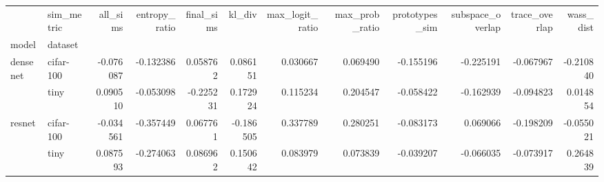 \begin{tabular}{llrrrrrrrrrr}
\toprule
       & sim\_metric &  all\_sims &  entropy\_ratio &  final\_sims &    kl\_div &  max\_logit\_ratio &  max\_prob\_ratio &  prototypes\_sim &  subspace\_overlap &  trace\_overlap &  wass\_dist \\
model & dataset &           &                &             &           &                  &                 &                 &                   &                &            \\
\midrule
densenet & cifar-100 & -0.076087 &      -0.132386 &    0.058762 &  0.086151 &         0.030667 &        0.069490 &       -0.155196 &         -0.225191 &      -0.067967 &  -0.210840 \\
       & tiny &  0.090510 &      -0.053098 &   -0.225231 &  0.172924 &         0.115234 &        0.204547 &       -0.058422 &         -0.162939 &      -0.094823 &   0.014854 \\
resnet & cifar-100 & -0.034561 &      -0.357449 &    0.067761 & -0.186505 &         0.337789 &        0.280251 &       -0.083173 &          0.069066 &      -0.198209 &  -0.055021 \\
       & tiny &  0.087593 &      -0.274063 &    0.086962 &  0.150642 &         0.083979 &        0.073839 &       -0.039207 &         -0.066035 &      -0.073917 &   0.264839 \\
\bottomrule
\end{tabular}
